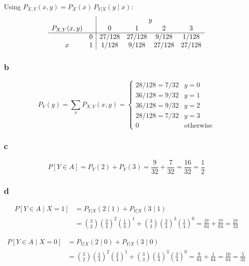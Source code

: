 \documentclass{article}
\begin{document}
Using $P_{X,Y}(x,y) = P_X(x)\,P_{Y|X}(y \mid x)$:
\[
	\begin{array}{cc|cccc}
		             &   & \multicolumn{4}{c}{y}                            \\
		P_{X,Y}(x,y) &   & 0                     & 1      & 2      & 3      \\ \hline
		             & 0 & 27/128                & 27/128 & 9/128  & 1/128  \\
		x            & 1 & 1/128                 & 9/128  & 27/128 & 27/128 \\
	\end{array}
\]

\subsubsection*{b}

\[
	P_Y(y) = \sum_{x} P_{X,Y}(x,y) =
	\begin{cases}
		28/128 = 7/32 & y = 0            \\
		36/128 = 9/32 & y = 1            \\
		36/128 = 9/32 & y = 2            \\
		28/128 = 7/32 & y = 3            \\
		0             & \text{otherwise}
	\end{cases}
\]

\subsubsection*{c}

\[ P[Y \in A] = P_Y(2) + P_Y(3) = \frac{9}{32} + \frac{7}{32} = \frac{16}{32} = \frac{1}{2} \]

\subsubsection*{d}

\begin{align*}
	P[Y \in A \mid X = 1] & = P_{Y|X}(2 \mid 1) + P_{Y|X}(3 \mid 1)                                                                                                           \\
	                      & = \binom{3}{2}\!\left(\tfrac{3}{4}\right)^2\!\left(\tfrac{1}{4}\right)^1 + \binom{3}{3}\!\left(\tfrac{3}{4}\right)^3\!\left(\tfrac{1}{4}\right)^0
	= \frac{27}{64} + \frac{27}{64} = \frac{27}{32}
\end{align*}

\begin{align*}
	P[Y \in A \mid X = 0] & = P_{Y|X}(2 \mid 0) + P_{Y|X}(3 \mid 0)                                                                                                           \\
	                      & = \binom{3}{2}\!\left(\tfrac{1}{4}\right)^2\!\left(\tfrac{3}{4}\right)^1 + \binom{3}{3}\!\left(\tfrac{1}{4}\right)^3\!\left(\tfrac{3}{4}\right)^0
	= \frac{9}{64} + \frac{1}{64} = \frac{10}{64} = \frac{5}{32}
\end{align*}
\end{document}
